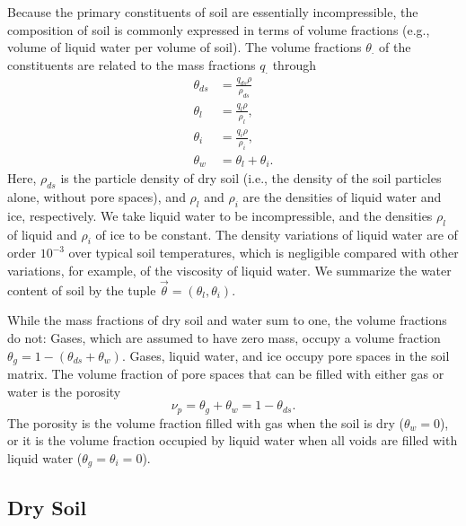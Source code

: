 \documentclass[twoside,10pt]{report}
\begin{document}
Because the primary constituents of soil are essentially incompressible, the composition of soil is commonly expressed in terms of volume fractions (e.g., volume of liquid water per volume of soil). The volume fractions $\theta_{\cdot}$ of the constituents are related to the mass fractions $q_{\cdot}$ through
\begin{subequations}\label{e:vol_fractions}
\begin{align}
    \theta_{ds} &= \frac{q_{ds} \rho}{\rho_{ds}} \\
    \theta_l &= \frac{q_l \rho}{\rho_l}, \\
    \theta_i &= \frac{q_i \rho}{\rho_i}, \\
    \theta_w &= \theta_l + \theta_i.
\end{align}
\end{subequations}
Here, $\rho_{ds}$ is the particle density of dry soil (i.e., the density of the soil particles alone, without pore spaces), and $\rho_l$ and $\rho_i$ are the densities of liquid water and ice, respectively. We take liquid water to be incompressible, and the densities $\rho_l$ of liquid and $\rho_i$ of ice to be constant. The density variations of liquid water are of order $10^{-3}$ over typical soil temperatures, which is negligible compared with other variations, for example, of the viscosity of liquid water. We summarize the water content of soil by the  tuple $\vec{\theta} = (\theta_l, \theta_i)$.

While the mass fractions of dry soil and water sum to one, the volume fractions do not: Gases, which are assumed to have zero mass, occupy a volume fraction $\theta_g = 1 - (\theta_{ds} + \theta_w)$. Gases, liquid water, and ice occupy pore spaces in the soil matrix. The volume fraction of pore spaces that can be filled with either gas or water is the porosity 
\begin{equation}\label{e:porosity}
    \nu_p = \theta_g + \theta_w =  1 - \theta_{ds}.
\end{equation}
The porosity is the volume fraction filled with gas when the soil is dry ($\theta_w=0$), or it is the volume fraction occupied by liquid water when all voids are filled with liquid water ($\theta_g = \theta_i = 0$). 

\subsection{Dry Soil}
\end{document}
